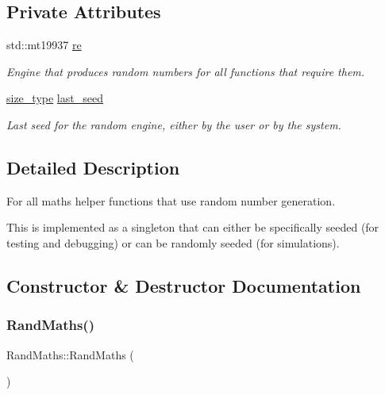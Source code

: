 \subsection*{Private Attributes}
\begin{DoxyCompactItemize}
\item 
std\+::mt19937 \hyperlink{classretrocombinator_1_1RandMaths_a8455f3a94efd124edd0ecfc806744476}{re}
\begin{DoxyCompactList}\small\item\em Engine that produces random numbers for all functions that require them. \end{DoxyCompactList}\item 
\hyperlink{namespaceretrocombinator_a8e1541b50cee66a791df4c437ccbb385}{size\+\_\+type} \hyperlink{classretrocombinator_1_1RandMaths_ab5b6bec8e0eaea80efe565cddc8e69ac}{last\+\_\+seed}
\begin{DoxyCompactList}\small\item\em Last seed for the random engine, either by the user or by the system. \end{DoxyCompactList}\end{DoxyCompactItemize}


\subsection{Detailed Description}
For all maths helper functions that use random number generation. 

This is implemented as a singleton that can either be specifically seeded (for testing and debugging) or can be randomly seeded (for simulations). 

\subsection{Constructor \& Destructor Documentation}
\mbox{\label{classretrocombinator_1_1RandMaths_aa507e7465f9a650d560aa42c7f75310f}} 
\subsubsection{\texorpdfstring{Rand\+Maths()}{RandMaths()}\hspace{0.1cm}{\footnotesize\ttfamily [1/2]}}
{\footnotesize\ttfamily Rand\+Maths\+::\+Rand\+Maths (\begin{DoxyParamCaption}{ }\end{DoxyParamCaption})\hspace{0.3cm}{\ttfamily [private]}}



